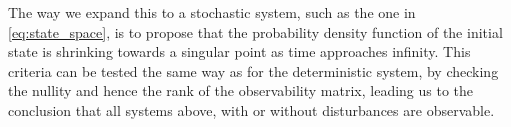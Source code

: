 The way we expand this to a stochastic system, such as the one in \cref{eq:state_space}, is to propose that the probability density function of the initial state is shrinking towards a singular point as time approaches infinity. This criteria can be tested the same way as for the deterministic system, by checking the nullity and hence the rank of the observability matrix, leading us to the conclusion that all systems above, with or without disturbances are observable.
